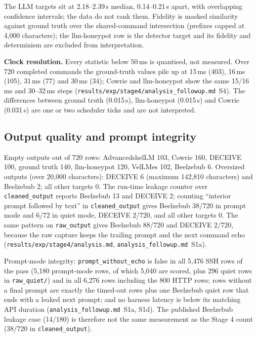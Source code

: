\documentclass[a4paper,11pt]{article}
\begin{document}
The LLM targets sit at 2.18--2.39\,s median, 0.14--0.21\,s apart, with
overlapping confidence intervals; the data do not rank them. Fidelity is
masked similarity against ground truth over the shared-command intersection
(prefixes capped at 4,000 characters);
the llm-honeypot row is the detector target and its fidelity and determinism
are excluded from interpretation.

\textbf{Clock resolution.} Every statistic below 50\,ms is quantised, not
measured. Over 720 completed commands the ground-truth values pile up at
15\,ms (403), 16\,ms (105), 31\,ms (77) and 30\,ms (34); Cowrie and llm-honeypot
show the same 15/16\,ms and 30--32\,ms steps
(\texttt{results/exp/stage4/analysis\_followup.md}~S4). The differences between
ground truth (0.015\,s), llm-honeypot (0.015\,s) and Cowrie (0.031\,s) are one
or two scheduler ticks and are not interpreted.

\subsection{Output quality and prompt integrity}
\label{sec:s4-quality}

Empty outputs out of 720 rows: AdvancedshelLM 103, Cowrie 160, DECEIVE 100,
ground truth 140, llm-honeypot 120, VelLMes 102, Beelzebub 6. Oversized outputs
(over 20,000 characters): DECEIVE 6 (maximum 142,810 characters) and Beelzebub
2; all other targets 0. The run-time leakage counter over
\texttt{cleaned\_output} reports Beelzebub 13 and DECEIVE 2; counting ``interior
prompt followed by text'' in \texttt{cleaned\_output} gives Beelzebub 38/720 in
prompt mode and 6/72 in quiet mode, DECEIVE 2/720, and all other targets 0. The
same pattern on \texttt{raw\_output} gives Beelzebub 88/720 and DECEIVE 2/720,
because the raw capture keeps the trailing prompt and the next command echo (\texttt{results/exp/stage4/analysis.md},
\texttt{analysis\_followup.md}~S1a).

Prompt-mode integrity: \texttt{prompt\_without\_echo} is false in all 5,476 SSH
rows of the pass (5,180 prompt-mode rows, of which 5,040 are scored, plus 296
quiet rows in \texttt{raw\_quiet/}) and in all 6,276 rows including the 800 HTTP
rows; rows without a final prompt are exactly the timed-out
rows plus one Beelzebub quiet row that ends with a leaked next prompt; and no
harness latency is below its matching API duration
(\texttt{analysis\_followup.md}~S1a, S1d). The published Beelzebub leakage case
(14/180) is therefore not the same measurement as the Stage 4 count
(38/720 in \texttt{cleaned\_output}).
\end{document}
